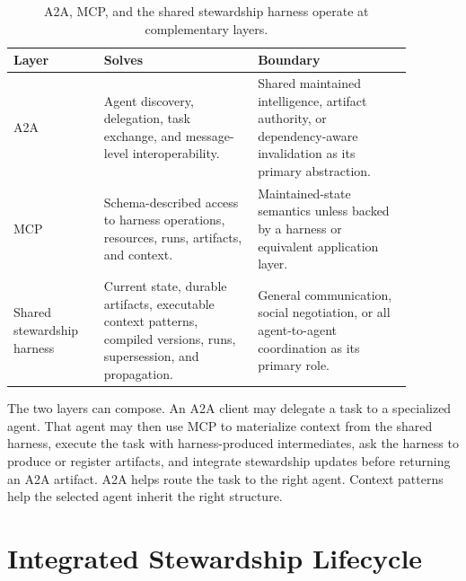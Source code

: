 \documentclass{article}
\begin{document}
\begin{table}[H]
\centering
\small
\begin{tabular}{p{0.20\linewidth}p{0.34\linewidth}p{0.34\linewidth}}
\toprule
\textbf{Layer} & \textbf{Solves} & \textbf{Boundary} \\
\midrule
A2A & Agent discovery, delegation, task exchange, and message-level interoperability. & Shared maintained intelligence, artifact authority, or dependency-aware invalidation as its primary abstraction. \\
MCP & Schema-described access to harness operations, resources, runs, artifacts, and context. & Maintained-state semantics unless backed by a harness or equivalent application layer. \\
Shared stewardship harness & Current state, durable artifacts, executable context patterns, compiled versions, runs, supersession, and propagation. & General communication, social negotiation, or all agent-to-agent coordination as its primary role. \\
\bottomrule
\end{tabular}
\caption{A2A, MCP, and the shared stewardship harness operate at complementary layers.}
\label{tab:layers}
\end{table}

The two layers can compose. An A2A client may delegate a task to a specialized agent. That agent may then use MCP to materialize context from the shared harness, execute the task with harness-produced intermediates, ask the harness to produce or register artifacts, and integrate stewardship updates before returning an A2A artifact. A2A helps route the task to the right agent. Context patterns help the selected agent inherit the right structure.

\section{Integrated Stewardship Lifecycle}
\end{document}
